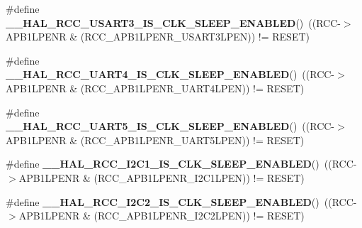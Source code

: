 \begin{DoxyCompactItemize}
\item 
\mbox{\label{group___r_c_c___clock___sleep___enable___disable___status_ga998cffc84c7d5866a7e4cfae1f764327}} 
\#define {\bfseries \+\_\+\+\_\+\+H\+A\+L\+\_\+\+R\+C\+C\+\_\+\+U\+S\+A\+R\+T3\+\_\+\+I\+S\+\_\+\+C\+L\+K\+\_\+\+S\+L\+E\+E\+P\+\_\+\+E\+N\+A\+B\+L\+ED}()~((R\+CC-\/$>$A\+P\+B1\+L\+P\+E\+NR \& (R\+C\+C\+\_\+\+A\+P\+B1\+L\+P\+E\+N\+R\+\_\+\+U\+S\+A\+R\+T3\+L\+P\+EN)) != R\+E\+S\+ET)
\item 
\mbox{\label{group___r_c_c___clock___sleep___enable___disable___status_ga5504a1aef7fbc81176238cc55e180e61}} 
\#define {\bfseries \+\_\+\+\_\+\+H\+A\+L\+\_\+\+R\+C\+C\+\_\+\+U\+A\+R\+T4\+\_\+\+I\+S\+\_\+\+C\+L\+K\+\_\+\+S\+L\+E\+E\+P\+\_\+\+E\+N\+A\+B\+L\+ED}()~((R\+CC-\/$>$A\+P\+B1\+L\+P\+E\+NR \& (R\+C\+C\+\_\+\+A\+P\+B1\+L\+P\+E\+N\+R\+\_\+\+U\+A\+R\+T4\+L\+P\+EN)) != R\+E\+S\+ET)
\item 
\mbox{\label{group___r_c_c___clock___sleep___enable___disable___status_ga02d346b69a45b942d0e7eeb5e31d597b}} 
\#define {\bfseries \+\_\+\+\_\+\+H\+A\+L\+\_\+\+R\+C\+C\+\_\+\+U\+A\+R\+T5\+\_\+\+I\+S\+\_\+\+C\+L\+K\+\_\+\+S\+L\+E\+E\+P\+\_\+\+E\+N\+A\+B\+L\+ED}()~((R\+CC-\/$>$A\+P\+B1\+L\+P\+E\+NR \& (R\+C\+C\+\_\+\+A\+P\+B1\+L\+P\+E\+N\+R\+\_\+\+U\+A\+R\+T5\+L\+P\+EN)) != R\+E\+S\+ET)
\item 
\mbox{\label{group___r_c_c___clock___sleep___enable___disable___status_ga39a3efabea0fb3cffae7be7726dd668e}} 
\#define {\bfseries \+\_\+\+\_\+\+H\+A\+L\+\_\+\+R\+C\+C\+\_\+\+I2\+C1\+\_\+\+I\+S\+\_\+\+C\+L\+K\+\_\+\+S\+L\+E\+E\+P\+\_\+\+E\+N\+A\+B\+L\+ED}()~((R\+CC-\/$>$A\+P\+B1\+L\+P\+E\+NR \& (R\+C\+C\+\_\+\+A\+P\+B1\+L\+P\+E\+N\+R\+\_\+\+I2\+C1\+L\+P\+EN)) != R\+E\+S\+ET)
\item 
\mbox{\label{group___r_c_c___clock___sleep___enable___disable___status_gaffe9902aa539eca59920b6b165bd1c71}} 
\#define {\bfseries \+\_\+\+\_\+\+H\+A\+L\+\_\+\+R\+C\+C\+\_\+\+I2\+C2\+\_\+\+I\+S\+\_\+\+C\+L\+K\+\_\+\+S\+L\+E\+E\+P\+\_\+\+E\+N\+A\+B\+L\+ED}()~((R\+CC-\/$>$A\+P\+B1\+L\+P\+E\+NR \& (R\+C\+C\+\_\+\+A\+P\+B1\+L\+P\+E\+N\+R\+\_\+\+I2\+C2\+L\+P\+EN)) != R\+E\+S\+ET)

\end{DoxyCompactItemize}
